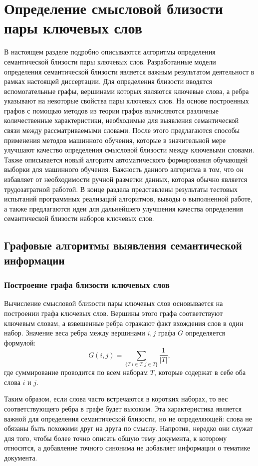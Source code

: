 \chapter{Определение смысловой близости пары ключевых слов} \label{chapt1}
В настоящем разделе подробно описываются алгоритмы определения семантической близости пары ключевых слов. Разработанные модели определения семантической близости является важным результатом деятельност в рамках настоящей диссертации.
Для определения близости вводятся вспомогательные графы, вершинами которых являются ключевые слова, а ребра указывают на некоторые свойства пары ключевых слов.
На основе построенных графов с помощью методов из теории графов вычисляются различные количественные характеристики, необходимые для выявления семантической связи между рассматриваемыми словами.
После этого предлагаются способы применения методов машинного обучения, которые в значительной мере улучшают качество определения смысловой близости между ключевыми словами. 
Также описывается новый алгоритм автоматического формирования обучающей выборки для машинного обучения. Важность данного алгоритма в том, что он избавляет от необходимости ручной разметки данных, которая обычно является трудозатратной работой.
В конце раздела представлены результаты тестовых испытаний программных реализаций алгоритмов, выводы о выполненной работе, а также предлагаются идеи для дальнейшего улучшения качества определения семантической близости наборов ключевых слов.

\section{Графовые алгоритмы выявления семантической информации}
\subsection{Построение графа близости ключевых слов} \label{sect1_1}
Вычисление смысловой близости пары ключевых слов основывается на построении графа ключевых слов. Вершины этого графа соответствуют ключевым словам, а взвешенные ребра отражают факт вхождения слов в один набор. Значение веса ребра между вершинами $i, j$ графа $G$ определяется формулой:
$$ G(i, j) = \sum_{\{T|i\in T, j \in T\}}\frac{1}{|T|}, $$
где суммирование проводится по всем наборам $T$, которые содержат в себе оба слова $i$ и $j$.

Таким образом, если слова часто встречаются в  коротких наборах, то вес соответствующего ребра в графе будет высоким. Эта характеристика является важной для определения семантической близости, но не определяющей: слова не обязаны быть похожими друг на друга по смыслу. Напротив, нередко они служат для того, чтобы более точно описать общую тему документа, к которому относятся, а добавление точного синонима не добавляет информации о тематике документа. 

